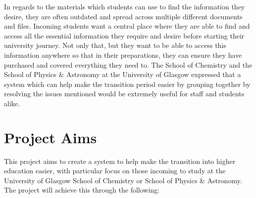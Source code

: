 \documentclass{l4proj}
\begin{document}
In regards to the materials which students can use to find the information they desire,  they are often outdated and spread across multiple different documents and files. Incoming students want a central place where they are able to find and access all the essential information they require and desire before starting their university journey. Not only that,  but they want to be able to access this information anywhere so that in their preparations,  they can ensure they have purchased and covered everything they need to. The School of Chemistry and the School of Physics \& Astronomy at the University of Glasgow expressed that a system which can help make the transition period easier by grouping together by resolving the issues mentioned would be extremely useful for staff and students alike.

\section{Project Aims}
This project aims to create a system to help make the transition into higher education easier,  with particular focus on those incoming to study at the University of Glasgow School of Chemistry or School of Physics \& Astronomy. The project will achieve this through the following:
\end{document}
